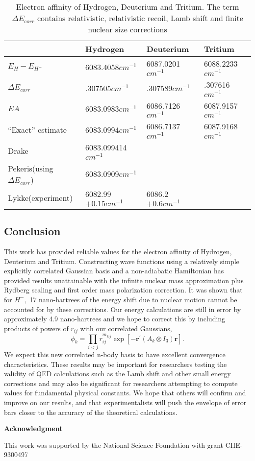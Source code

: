 \documentclass[12pt,thmsa]{article}
\begin{document}
\begin{table}[tbp] \centering%
\begin{tabular}{llll}
\hline\hline
& Hydrogen & Deuterium & Tritium \\ \hline
$E_H-E_{H^{-}}$ & 6083.4058$cm^{-1}$ & 6087.0201$cm^{-1}$ & 6088.2233$cm^{-1}
$ \\ 
$\Delta E_{corr}$ & .307505$cm^{-1}$ & .307589$cm^{-1}$ & .307616$cm^{-1}$
\\ 
$EA$ & 6083.0983$cm^{-1}$ & 6086.7126$cm^{-1}$ & 6087.9157$cm^{-1}$ \\ 
``Exact'' estimate & 6083.0994$cm^{-1}$ & 6086.7137$cm^{-1}$ & 6087.9168$%
cm^{-1}$ \\ \hline
Drake\cite{Drake88} & 6083.099414$cm^{-1}$ &  &  \\ 
Pekeris\cite{Pekeris62}(using $\Delta E_{corr}$) & 6083.0909$cm^{-1}$ &  & 
\\ 
Lykke\cite{Lykke91}(experiment) & 6082.99$\pm 0.15cm^{-1}$ & 6086.2$\pm
0.6cm^{-1}$ &  \\ \hline\hline
\end{tabular}
\caption{Electron affinity of Hydrogen, Deuterium and Tritium. The  term $ \Delta E_{corr} $
contains relativistic, relativistic recoil, Lamb shift and finite nuclear size corrections   \label{EAtab}}%
\end{table}%

\subsection{Conclusion}

This work has provided reliable values for the electron affinity of
Hydrogen, Deuterium and Tritium. Constructing wave functions using a
relatively simple explicitly correlated Gaussian basis and a non-adiabatic
Hamiltonian has provided results unattainable with the infinite nuclear mass
approximation plus Rydberg scaling and first order mass polarization
correction. It was shown that for $H^{-},$ 17 nano-hartrees of the energy
shift due to nuclear motion cannot be accounted for by these corrections.
Our energy calculations are still in error by approximately 4.9
nano-hartrees and we hope to correct this by including products of powers of 
$r_{ij}$ with our correlated Gaussians,
\begin{equation}
\phi _k=\prod_{i<j}r_{ij}^{m_{kij}}\exp \left[ -\mathbf{r}^{\prime
}(A_k\otimes I_3)\mathbf{r}\right] .
\end{equation}
We expect this new correlated n-body basis to have excellent convergence
characteristics. These results may be important for researchers testing the
validity of QED calculations such as the Lamb shift and other small energy
corrections and may also be significant for researchers attempting to
compute values for fundamental physical constants. We hope that others will
confirm and improve on our results, and that experimentalists will push the
envelope of error bars closer to the accuracy of the theoretical
calculations.

\noindent \textbf{Acknowledgment}

This work was supported by the National Science Foundation with grant
CHE-9300497



\end{document}

